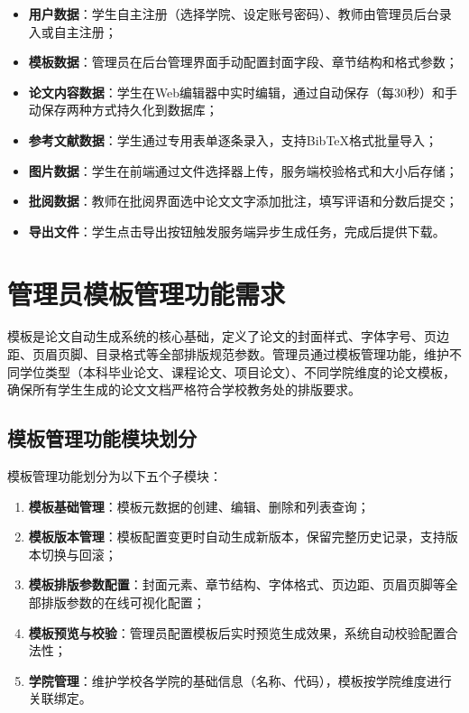\documentclass{../softeng}
\begin{document}
\begin{itemize}
    \item \textbf{用户数据}：学生自主注册（选择学院、设定账号密码）、教师由管理员后台录入或自主注册；
    \item \textbf{模板数据}：管理员在后台管理界面手动配置封面字段、章节结构和格式参数；
    \item \textbf{论文内容数据}：学生在Web编辑器中实时编辑，通过自动保存（每30秒）和手动保存两种方式持久化到数据库；
    \item \textbf{参考文献数据}：学生通过专用表单逐条录入，支持BibTeX格式批量导入；
    \item \textbf{图片数据}：学生在前端通过文件选择器上传，服务端校验格式和大小后存储；
    \item \textbf{批阅数据}：教师在批阅界面选中论文文字添加批注，填写评语和分数后提交；
    \item \textbf{导出文件}：学生点击导出按钮触发服务端异步生成任务，完成后提供下载。
\end{itemize}

\section{管理员模板管理功能需求}

模板是论文自动生成系统的核心基础，定义了论文的封面样式、字体字号、页边距、页眉页脚、目录格式等全部排版规范参数。管理员通过模板管理功能，维护不同学位类型（本科毕业论文、课程论文、项目论文）、不同学院维度的论文模板，确保所有学生生成的论文文档严格符合学校教务处的排版要求。

\subsection{模板管理功能模块划分}

模板管理功能划分为以下五个子模块：

\begin{enumerate}
    \item \textbf{模板基础管理}：模板元数据的创建、编辑、删除和列表查询；
    \item \textbf{模板版本管理}：模板配置变更时自动生成新版本，保留完整历史记录，支持版本切换与回滚；
    \item \textbf{模板排版参数配置}：封面元素、章节结构、字体格式、页边距、页眉页脚等全部排版参数的在线可视化配置；
    \item \textbf{模板预览与校验}：管理员配置模板后实时预览生成效果，系统自动校验配置合法性；
    \item \textbf{学院管理}：维护学校各学院的基础信息（名称、代码），模板按学院维度进行关联绑定。
\end{enumerate}
\end{document}

